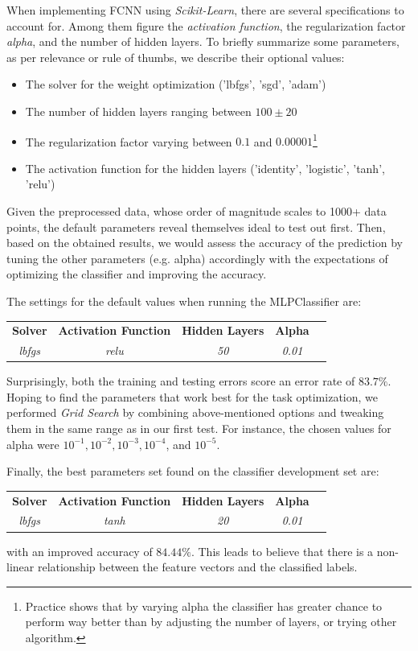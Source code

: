 When implementing FCNN using \emph{Scikit-Learn}, there are several specifications to account for. Among them figure the
\emph{activation function}, the regularization factor \emph{alpha}, and the number of hidden layers. To briefly
summarize some parameters, as per relevance or rule of thumbs, we describe their optional values:
\begin{itemize}
    \item The solver for the weight optimization ('lbfgs', 'sgd', 'adam')
    \item The number of hidden layers ranging between $100 \pm 20$
    \item The regularization factor varying between $0.1$ and $0.00001$\footnote{Practice shows that
    by varying alpha the classifier has greater chance to perform way better than by adjusting the
    number of layers, or trying other algorithm.}
    \item The activation function for the hidden layers ('identity', 'logistic', 'tanh', 'relu')
\end{itemize}

Given the preprocessed data, whose order of magnitude scales to 1000+ data points, the default parameters
reveal themselves ideal to test out first. Then, based on the obtained results, we would assess the accuracy of
the prediction by tuning the other parameters (e.g. alpha) accordingly with the expectations of optimizing
the classifier and improving the accuracy.

The settings for the default values when running the MLPClassifier are: %
\begin{center}
    \begin{tabular}{ c c c c c }
    \textbf{Solver} & \textbf{Activation Function} & \textbf{Hidden Layers}  &  \textbf{Alpha} \\
    \textit{lbfgs} & \textit{relu} & \textit{50} & \textit{0.01} \\
    \end{tabular}
\end{center}
Surprisingly, both the training and testing errors score an error rate of $83.7\%$. Hoping
to find the parameters that work best for the task optimization, we performed \emph{Grid Search} by combining
above-mentioned options and tweaking them in the same range as in our first test. For instance, the chosen
values for alpha were $10^{-1}, 10^{-2}, 10^{-3}, 10^{-4}$, and $10^{-5}$.

Finally, the best parameters set found on the classifier development set are:
\begin{center}
    \begin{tabular}{ c c c c c }
    \textbf{Solver} & \textbf{Activation Function} & \textbf{Hidden Layers}  &  \textbf{Alpha} \\
    \textit{lbfgs} & \textit{tanh} & \textit{20} & \textit{0.01} \\
    \end{tabular}
\end{center}
with an improved accuracy of $84.44\%$. This leads to believe that there is a non-linear relationship
between the feature vectors and the classified labels.

